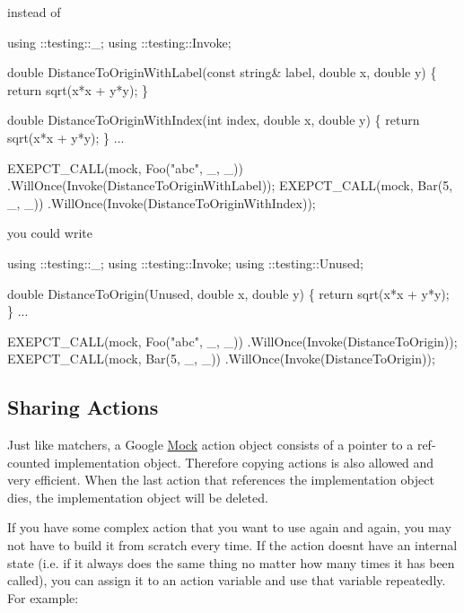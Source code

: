 instead of


\begin{DoxyCode}
using ::testing::\_;
using ::testing::Invoke;

\textcolor{keywordtype}{double} DistanceToOriginWithLabel(\textcolor{keyword}{const} \textcolor{keywordtype}{string}& label, \textcolor{keywordtype}{double} x, \textcolor{keywordtype}{double} y) \{
  \textcolor{keywordflow}{return} sqrt(x*x + y*y);
\}

\textcolor{keywordtype}{double} DistanceToOriginWithIndex(\textcolor{keywordtype}{int} index, \textcolor{keywordtype}{double} x, \textcolor{keywordtype}{double} y) \{
  \textcolor{keywordflow}{return} sqrt(x*x + y*y);
\}
...

  EXEPCT\_CALL(mock, Foo(\textcolor{stringliteral}{"abc"}, \_, \_))
      .WillOnce(Invoke(DistanceToOriginWithLabel));
  EXEPCT\_CALL(mock, Bar(5, \_, \_))
      .WillOnce(Invoke(DistanceToOriginWithIndex));
\end{DoxyCode}


you could write


\begin{DoxyCode}
using ::testing::\_;
using ::testing::Invoke;
using ::testing::Unused;

\textcolor{keywordtype}{double} DistanceToOrigin(Unused, \textcolor{keywordtype}{double} x, \textcolor{keywordtype}{double} y) \{
  \textcolor{keywordflow}{return} sqrt(x*x + y*y);
\}
...

  EXEPCT\_CALL(mock, Foo(\textcolor{stringliteral}{"abc"}, \_, \_))
      .WillOnce(Invoke(DistanceToOrigin));
  EXEPCT\_CALL(mock, Bar(5, \_, \_))
      .WillOnce(Invoke(DistanceToOrigin));
\end{DoxyCode}


\subsection*{Sharing Actions}

Just like matchers, a Google \hyperlink{classMock}{Mock} action object consists of a pointer to a ref-\/counted implementation object. Therefore copying actions is also allowed and very efficient. When the last action that references the implementation object dies, the implementation object will be deleted.

If you have some complex action that you want to use again and again, you may not have to build it from scratch every time. If the action doesn\textquotesingle{}t have an internal state (i.\+e. if it always does the same thing no matter how many times it has been called), you can assign it to an action variable and use that variable repeatedly. For example\+:


